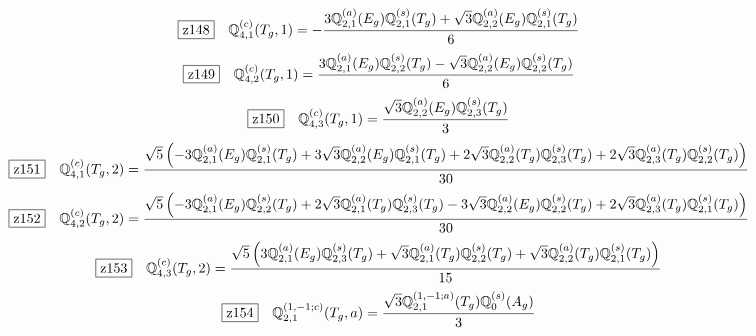 \documentclass[fleqn,10pt,landscape]{jsarticle}
\begin{document}
\begin{dmath*}
\hspace*{3mm}\fbox{z148}\quad \mathbb{Q}_{4,1}^{(c)}(T_{g},1)=- \frac{3 \mathbb{Q}_{2,1}^{(a)}(E_{g}) \mathbb{Q}_{2,1}^{(s)}(T_{g}) + \sqrt{3} \mathbb{Q}_{2,2}^{(a)}(E_{g}) \mathbb{Q}_{2,1}^{(s)}(T_{g})}{6}
\end{dmath*}
\begin{dmath*}
\hspace*{3mm}\fbox{z149}\quad \mathbb{Q}_{4,2}^{(c)}(T_{g},1)=\frac{3 \mathbb{Q}_{2,1}^{(a)}(E_{g}) \mathbb{Q}_{2,2}^{(s)}(T_{g}) - \sqrt{3} \mathbb{Q}_{2,2}^{(a)}(E_{g}) \mathbb{Q}_{2,2}^{(s)}(T_{g})}{6}
\end{dmath*}
\begin{dmath*}
\hspace*{3mm}\fbox{z150}\quad \mathbb{Q}_{4,3}^{(c)}(T_{g},1)=\frac{\sqrt{3} \mathbb{Q}_{2,2}^{(a)}(E_{g}) \mathbb{Q}_{2,3}^{(s)}(T_{g})}{3}
\end{dmath*}
\begin{dmath*}
\hspace*{3mm}\fbox{z151}\quad \mathbb{Q}_{4,1}^{(c)}(T_{g},2)=\frac{\sqrt{5} \left(- 3 \mathbb{Q}_{2,1}^{(a)}(E_{g}) \mathbb{Q}_{2,1}^{(s)}(T_{g}) + 3 \sqrt{3} \mathbb{Q}_{2,2}^{(a)}(E_{g}) \mathbb{Q}_{2,1}^{(s)}(T_{g}) + 2 \sqrt{3} \mathbb{Q}_{2,2}^{(a)}(T_{g}) \mathbb{Q}_{2,3}^{(s)}(T_{g}) + 2 \sqrt{3} \mathbb{Q}_{2,3}^{(a)}(T_{g}) \mathbb{Q}_{2,2}^{(s)}(T_{g})\right)}{30}
\end{dmath*}
\begin{dmath*}
\hspace*{3mm}\fbox{z152}\quad \mathbb{Q}_{4,2}^{(c)}(T_{g},2)=\frac{\sqrt{5} \left(- 3 \mathbb{Q}_{2,1}^{(a)}(E_{g}) \mathbb{Q}_{2,2}^{(s)}(T_{g}) + 2 \sqrt{3} \mathbb{Q}_{2,1}^{(a)}(T_{g}) \mathbb{Q}_{2,3}^{(s)}(T_{g}) - 3 \sqrt{3} \mathbb{Q}_{2,2}^{(a)}(E_{g}) \mathbb{Q}_{2,2}^{(s)}(T_{g}) + 2 \sqrt{3} \mathbb{Q}_{2,3}^{(a)}(T_{g}) \mathbb{Q}_{2,1}^{(s)}(T_{g})\right)}{30}
\end{dmath*}
\begin{dmath*}
\hspace*{3mm}\fbox{z153}\quad \mathbb{Q}_{4,3}^{(c)}(T_{g},2)=\frac{\sqrt{5} \left(3 \mathbb{Q}_{2,1}^{(a)}(E_{g}) \mathbb{Q}_{2,3}^{(s)}(T_{g}) + \sqrt{3} \mathbb{Q}_{2,1}^{(a)}(T_{g}) \mathbb{Q}_{2,2}^{(s)}(T_{g}) + \sqrt{3} \mathbb{Q}_{2,2}^{(a)}(T_{g}) \mathbb{Q}_{2,1}^{(s)}(T_{g})\right)}{15}
\end{dmath*}
\begin{dmath*}
\hspace*{3mm}\fbox{z154}\quad \mathbb{Q}_{2,1}^{(1,-1;c)}(T_{g},a)=\frac{\sqrt{3} \mathbb{Q}_{2,1}^{(1,-1;a)}(T_{g}) \mathbb{Q}_{0}^{(s)}(A_{g})}{3}
\end{dmath*}
\end{document}

